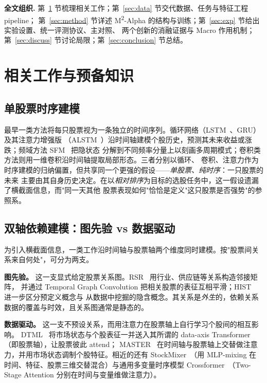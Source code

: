 \documentclass[a4paper,11pt,fontset=fandol]{ctexart}
\newcommand{\msqa}{\texorpdfstring{M\textsuperscript{2}-Alpha}{M2-Alpha}} %
\begin{document}
\noindent\textbf{\heiti 全文组织.}
第~\ref{sec:related} 节梳理相关工作；第~\ref{sec:data} 节交代数据、任务与特征工程 pipeline；
第~\ref{sec:method} 节详述 \msqa{} 的结构与训练；第~\ref{sec:exp} 节给出实验设置、统一评测协议、主对照、
两个创新的消融证据与 Macro 作用机制；第~\ref{sec:discuss} 节讨论局限；第~\ref{sec:conclusion} 节总结。

\section{相关工作与预备知识}\label{sec:related}

\subsection{单股票时序建模}\label{sec:rw-seq}
最早一类方法将每只股票视为一条独立的时间序列。循环网络（LSTM~\cite{lstm}、GRU）及其注意力增强版
（ALSTM~\cite{alstm}）沿时间轴建模个股历史，预测其未来收益或涨跌；频域方法 SFM~\cite{sfm} 把隐状态
分解到不同频率分量上以刻画多周期模式；卷积类方法则用一维卷积沿时间轴提取局部形态。三者分别以循环、
卷积、注意力作为时序建模的归纳偏置，但共享同一个更强的假设——\emph{单股票、纯时序}：一只股票的未来
主要由其自身历史决定。在以\emph{相对排序}为目标的选股任务中，这一假设遗漏了横截面信息，而"同一天其他
股票表现如何"恰恰是定义"这只股票是否强势"的参照系。

\subsection{双轴依赖建模：图先验 vs 数据驱动}\label{sec:rw-dual}
为引入横截面信息，一类工作沿时间轴与股票轴两个维度同时建模。按"股票间关系来自何处"，可分为两支。

\textbf{\heiti 图先验。} 这一支显式给定股票关系图。RSR~\cite{rsr} 用行业、供应链等关系构造邻接矩阵，
并通过 Temporal Graph Convolution 把相关股票的表征互相平滑；HIST~\cite{hist} 进一步区分预定义概念与
从数据中挖掘的隐含概念。其关系是\emph{外生}的，依赖关系数据的覆盖与时效，且关系图通常是静态的。

\textbf{\heiti 数据驱动。} 这一支不预设关系，而用注意力在股票轴上自行学习个股间的相互影响。
DTML~\cite{dtml} 将市场状态与个股表征一并送入其所谓的 data-axis Transformer（即股票轴），让股票彼此 attend；
MASTER~\cite{master} 在时间轴与股票轴上交替做注意力，并用市场状态调制个股特征。相近的还有
StockMixer~\cite{stockmixer}（用 MLP-mixing 在时间、特征、股票三维交替混合）与通用多变量时序模型
Crossformer~\cite{crossformer}（Two-Stage Attention 分别在时间与变量维做注意力）。
\end{document}
